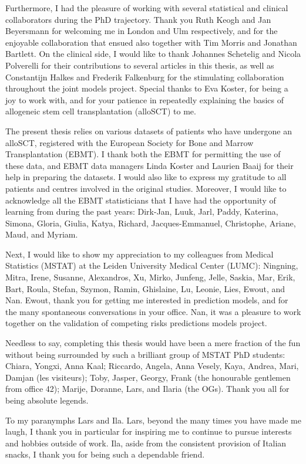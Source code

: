 \documentclass[
  letterpaper,
  paper=240mm:170mm,
  twoside=true,
  open=right,
  fontsize=10pt,
  pagesize=false,
  BCOR=15mm,
  DIV=14,
  headinclude=true,
  footinclude=false,
  headsepline=on]{scrbook}
\begin{document}
Furthermore, I had the pleasure of working with several statistical and
clinical collaborators during the PhD trajectory. Thank you Ruth Keogh
and Jan Beyersmann for welcoming me in London and Ulm respectively, and
for the enjoyable collaboration that ensued also together with Tim
Morris and Jonathan Bartlett. On the clinical side, I would like to
thank Johannes Schetelig and Nicola Polverelli for their contributions
to several articles in this thesis, as well as Constantijn Halkes and
Frederik Falkenburg for the stimulating collaboration throughout the
joint models project. Special thanks to Eva Koster, for being a joy to
work with, and for your patience in repeatedly explaining the basics of
allogeneic stem cell transplantation (alloSCT) to me.

The present thesis relies on various datasets of patients who have
undergone an alloSCT, registered with the European Society for Bone and
Marrow Transplantation (EBMT). I thank both the EBMT for permitting the
use of these data, and EBMT data managers Linda Koster and Laurien Baaij
for their help in preparing the datasets. I would also like to express
my gratitude to all patients and centres involved in the original
studies. Moreover, I would like to acknowledge all the EBMT
statisticians that I have had the opportunity of learning from during
the past years: Dirk-Jan, Luuk, Jarl, Paddy, Katerina, Simona, Gloria,
Giulia, Katya, Richard, Jacques-Emmanuel, Christophe, Ariane, Maud, and
Myriam.

Next, I would like to show my appreciation to my colleagues from Medical
Statistics (MSTAT) at the Leiden University Medical Center (LUMC):
Ningning, Mitra, Irene, Susanne, Alexandros, Xu, Mirko, Junfeng, Jelle,
Saskia, Mar, Erik, Bart, Roula, Stefan, Szymon, Ramin, Ghislaine, Lu,
Leonie, Lies, Ewout, and Nan. Ewout, thank you for getting me interested
in prediction models, and for the many spontaneous conversations in your
office. Nan, it was a pleasure to work together on the validation of
competing risks predictions models project.

Needless to say, completing this thesis would have been a mere fraction
of the fun without being surrounded by such a brilliant group of MSTAT
PhD students: Chiara, Yongxi, Anna Kaal; Riccardo, Angela, Anna Vesely,
Kaya, Andrea, Mari, Damjan (les visiteurs); Toby, Jasper, Georgy, Frank
(the honourable gentlemen from office 42); Marije, Doranne, Lars, and
Ilaria (the OGs). Thank you all for being absolute legends.

To my paranymphs Lars and Ila. Lars, beyond the many times you have made
me laugh, I thank you in particular for inspiring me to continue to
pursue interests and hobbies outside of work. Ila, aside from the
consistent provision of Italian snacks, I thank you for being such a
dependable friend.
\end{document}
